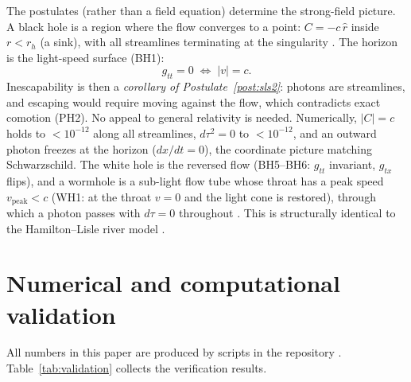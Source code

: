 \documentclass[aps,prd,preprint,superscriptaddress,amsmath,amssymb]{revtex4-2}
\begin{document}
The postulates (rather than a field equation) determine the strong-field
picture.  A black hole is a region where the flow converges to a point:
$C=-c\,\hat{r}$ inside $r<r_h$ (a sink), with all streamlines terminating at
the singularity \cite{ProjectionPhysics-MF}.  The horizon is the
light-speed surface (BH1):
\begin{equation}
g_{tt}=0 \;\Longleftrightarrow\; |v|=c .
\end{equation}
Inescapability is then a \emph{corollary of Postulate~\ref{post:sls2}}:
photons are streamlines, and escaping would require moving against the flow,
which contradicts exact comotion (PH2).  No appeal to general relativity is
needed.  Numerically, $|C|=c$ holds to $<10^{-12}$ along all streamlines,
$d\tau^2=0$ to $<10^{-12}$, and an outward photon freezes at the horizon
($dx/dt=0$), the coordinate picture matching Schwarzschild.  The white hole
is the reversed flow (BH5--BH6: $g_{tt}$ invariant, $g_{tx}$ flips), and a
wormhole is a sub-light flow tube whose throat has a peak speed
$v_{\mathrm{peak}}<c$ (WH1: at the throat $v=0$ and the light cone is
restored), through which a photon passes with $d\tau=0$ throughout
\cite{ProjectionPhysics-BH}.  This is structurally identical to the
Hamilton--Lisle river model \cite{HamiltonLisle2008}.

\section{Numerical and computational validation}\label{sec:validation}

All numbers in this paper are produced by scripts in the repository
\cite{ProjectionPhysics}.  Table~\ref{tab:validation} collects the
verification results.
\end{document}
